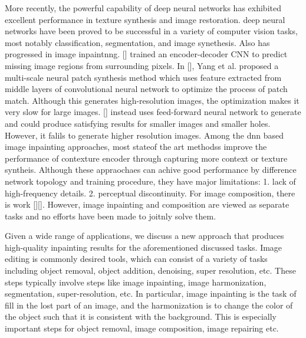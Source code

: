 \documentclass[runningheads]{llncs}
\begin{document}
More recently, the powerful capability of deep neural networks has exhibited excellent performance in texture synthesis and image restoration. deep neural networks have been proved to be successful in a variety of computer vision tasks, most notably classification, segmentation, and image synethesis. Also has progressed in image inpaintnng. [] trained an encoder-decoder CNN to predict missing image regions from surrounding pixels. In [], Yang et al. proposed a multi-scale neural patch synthesis method which uses feature extracted from middle layers of convolutional neural network to optimize the process of patch match. Although this generates high-resolution images, the optimization makes it very slow for large images. [] instead uses feed-forward neural network to generate and could produce satisfying results for smaller images and smaller holes. However, it falils to generate higher resolution images.  Among the dnn based image inpainting approaches, most stateof the art methodss improve the performance of contexture encoder through capturing more context or texture syntheis. Although these appraochaes can achive good performance by difference network topology and training procedure, they have major limitations: 1. lack of high-frequency details. 2. perceptual discontinuity. For image composition, there is work [][]. However, image inpainting and composition are viewed as separate tasks and no efforts have been made to joitnly solve them.

Given a wide range of applications, we discuss a new approach that produces high-quality inpainting results for the aforementioned discussed tasks. Image editing is commonly desired tools, which can consist of a variety of tasks including object removal, object addition, denoising, super resolution, etc. These steps typically involve steps like image inpainting, image harmonization, segmentation, super-resolution, etc. In particular, image inpainting is the task of fill in the lost part of an image, and the harmonization is to change the color of the object such that it is consistent with the background. This is especially important steps for object removal, image composition, image repairing etc.
\end{document}
